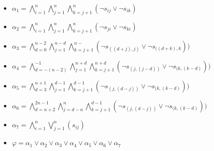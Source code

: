 \documentclass [11pt]{article}
\renewcommand{\phi}{\varphi}
\begin{document}
 \begin{center}
 \begin{itemize}
\item $ \alpha_1 = \bigwedge _{i=1} ^{n}   \bigwedge _{j=1} ^{n}   \bigwedge _{k=j+1} ^{n} (\neg s_{ij} \vee \neg s_{ik} ) $
\item $ \alpha_2 = \bigwedge _{i=1} ^{n}   \bigwedge _{j=1} ^{n}   \bigwedge _{k=j+1} ^{n} (\neg s_{ji} \vee \neg s_{ki} ) $
\item $ \alpha_3 = \bigwedge _{d=0} ^{n-2}   \bigwedge _{j=1} ^{n-d}   \bigwedge _{k=j+1} ^{n-} (\neg s_{((d+j),j)} \vee \neg s_{((d+k),k} )) $
\item $ \alpha_4 = \bigwedge _{d=-(n-2)} ^{-1}   \bigwedge _{j=1} ^{n+d}   \bigwedge _{k=j+1} ^{n+d} (\neg s_{(j,(j-d))} \vee \neg s_{(k,(k-d)} )) $
\item $ \alpha_5 = \bigwedge _{d=3} ^{n+1}   \bigwedge _{j=1} ^{d-1}   \bigwedge _{k=j+1} ^{d-1} (\neg s_{(j,(d-j))} \vee \neg s_{(k,(k-d)} )) $
\item $ \alpha_6 = \bigwedge _{d=n+2} ^{2n-1}   \bigwedge _{j=d-n} ^{n}   \bigwedge _{k=j+1} ^{d-1} (\neg s_{(j,(d-j))} \vee \neg s_{(k,(k-d)} )) $
\item $ \alpha_7 = \bigwedge _{i=1} ^{n}   \bigvee _{j=1} ^{n} (s_{ij}) $

  \bigskip
\item $\phi =  \alpha_1 \vee \alpha_2 \vee \alpha_3 \vee \alpha_4 \vee \alpha_5 \vee \alpha_6 \vee \alpha_7$ 

 \end{itemize}
\end{center}
\end{document}
